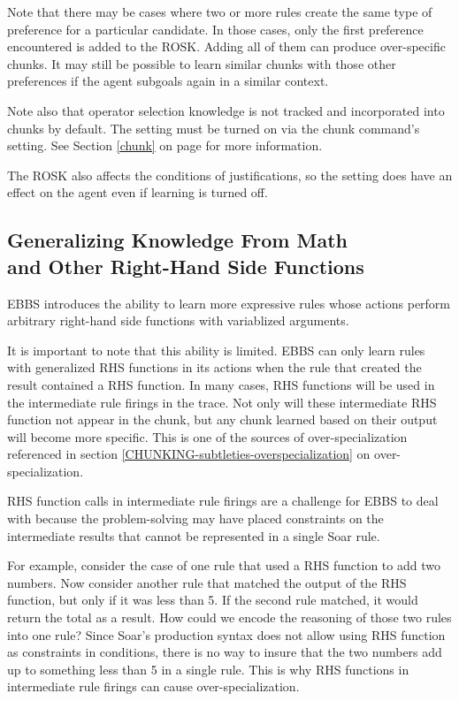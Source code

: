 Note that there may be cases where two or more rules create the same type of preference for a particular candidate. In those cases, only the first preference encountered is added to the ROSK. Adding all of them can produce over-specific chunks. It may still be possible to learn similar chunks with those other preferences if the agent subgoals again in a similar context.

Note also that operator selection knowledge is not tracked and incorporated into chunks by default. The setting must be turned on via the chunk command's  setting. See Section \ref{chunk} on page \pageref{chunk} for more information.

The ROSK also affects the conditions of justifications, so the  setting does have an effect on the agent even if learning is turned off.

\subsection{\texorpdfstring{Generalizing Knowledge From Math \\ and Other Right-Hand Side Functions}{Generalizing From RHS Functions}}
\label{CHUNKING-subtleties-rhs-functions}

EBBS introduces the ability to learn more expressive rules whose actions perform arbitrary right-hand side functions with variablized arguments.

It is important to note that this ability is limited.  EBBS can only learn rules with generalized RHS functions in its actions when the rule that created the result contained a RHS function.  In many cases, RHS functions will be used in the intermediate rule firings in the  trace.  Not only will these intermediate RHS function not appear in the chunk, but any chunk learned based on their output will become more specific.  This is one of the sources of over-specialization referenced in section \ref{CHUNKING-subtleties-overspecialization} on over-specialization.

RHS function calls in intermediate rule firings are a challenge for EBBS to deal with because the problem-solving may have placed constraints on the intermediate results that cannot be represented in a single Soar rule.

For example, consider the case of one rule that used a RHS function to add two numbers.  Now consider another rule that matched the output of the RHS function, but only if it was less than 5.  If the second rule matched, it would return the total as a result.  How could we encode the reasoning of those two rules into one rule?  Since Soar's production syntax does not allow using RHS function as constraints in conditions, there is no way to insure that the two numbers add up to something less than 5 in a single rule.  This is why RHS functions in intermediate rule firings can cause over-specialization.

